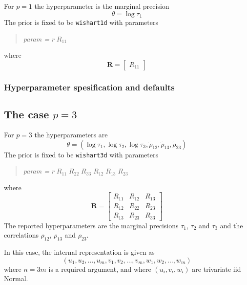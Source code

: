 \documentclass[a4paper,11pt]{article}
\begin{document}
For $p=1$ the
hyperparameter is the marginal precision
\begin{displaymath}
    \theta = \log \tau_{1}
\end{displaymath}
The prior is fixed to be \texttt{wishart1d} with parameters
\begin{quote}
    \emph{param = } $r\;R_{11}$
\end{quote}
where
\begin{displaymath}
    \mathbf{R} =
    \left[\begin{array}{c}
        R_{11}
    \end{array}\right]
\end{displaymath}

\subsubsection*{Hyperparameter spesification and defaults}



\subsection*{The case $p=3$}

For $p=3$ the
hyperparameters are
\begin{displaymath}
    \theta = (\log \tau_{1}, \log \tau_{2}, \log \tau_{3},
    \tilde\rho_{12},
    \tilde\rho_{13},
    \tilde\rho_{23})
\end{displaymath}
The prior is fixed to be \texttt{wishart3d} with parameters
\begin{quote}
    \emph{param = } $r\;R_{11}\;R_{22}\;R_{33}\; R_{12}\;
    R_{13}\; R_{23}$
\end{quote}
where
\begin{displaymath}
    \mathbf{R} =
    \left[\begin{array}{ccc}
        R_{11} &R_{12} & R_{13}\\
        R_{12} & R_{22} & R_{23}\\
        R_{13} & R_{23} & R_{33}
    \end{array}\right]
\end{displaymath}
The reported hyperparameters are the marginal precisions $\tau_{1}$,
$\tau_{2}$ and $\tau_{3}$ and the correlations $\rho_{12}$,
$\rho_{13}$ and $\rho_{23}$.

In this case, the internal representation is given as
\begin{displaymath}
    (u_{1}, u_{2}, \ldots, u_{m}, v_{1}, v_{2}, \ldots, v_{m},
    w_{1}, w_{2}, \ldots, w_{m})
\end{displaymath}
where $n=3m$ is a required argument, and where $(u_{i}, v_{i}, w_{i})$
are trivariate iid Normal.
\end{document}
